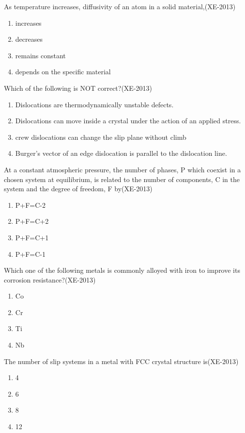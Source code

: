 \documentclass[journal]{IEEEtran}
\numberwithin{equation}{enumi}
\numberwithin{figure}{enumi}
\begin{document}
\item As temperature increases, diffusivity of an atom in a solid material,\hfill(XE-2013)
\begin{enumerate}
    \item increases
    \item decreases
    \item remains constant
    \item depends on the specific material
\end{enumerate}
\item Which of the following is NOT correct?\hfill(XE-2013)
\begin{enumerate}
    \item Dislocations are thermodynamically unstable defects.
    \item Dislocations can move inside a crystal under the action of an applied stress.
    \item crew dislocations can change the slip plane without climb
    \item Burger's vector of an edge dislocation is parallel to the dislocation line.
    
\end{enumerate}
\item At a constant atmospheric pressure, the number of phases, P which coexist in a chosen system at equilibrium, is related to the number of components, C in the system and the degree of freedom, F
by\hfill(XE-2013)
\begin{enumerate}
    \item P+F=C-2
    \item P+F=C+2
    \item P+F=C+1
    \item P+F=C-1
\end{enumerate}
\item Which one of the following metals is commonly alloyed with iron to improve its corrosion resistance?\hfill(XE-2013)
\begin{enumerate}
    \item Co
    \item Cr
    \item Ti
    \item Nb
    
\end{enumerate}
\item The number of slip systems in a metal with FCC crystal structure is\hfill(XE-2013)
\begin{enumerate}
    \item 4
    \item 6
    \item 8
    \item 12
\end{enumerate}
\end{document}
